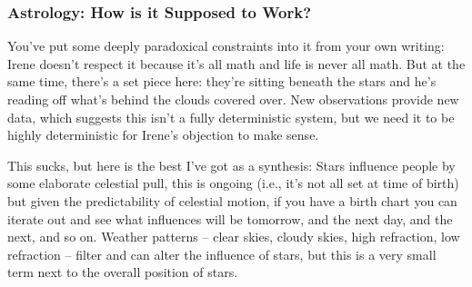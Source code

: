 \documentclass[../FGP.tex]{subfiles}
\begin{document}
\subsubsection{Astrology: How is it Supposed to Work?}
You've put some deeply paradoxical constraints into it from your own writing: Irene doesn't respect it because it's all math and life is never all math. But at the same time, there's a set piece here: they're sitting beneath the stars and he's reading off what's behind the clouds covered over. New observations provide new data, which suggests this isn't a fully deterministic system, but we need it to be highly deterministic for Irene's objection to make sense. 

This sucks, but here is the best I've got as a synthesis: Stars influence people by some elaborate celestial pull, this is ongoing (i.e., it's not all set at time of birth) but given the predictability of celestial motion, if you have a birth chart you can iterate out and see what influences will be tomorrow, and the next day, and the next, and so on. Weather patterns -- clear skies, cloudy skies, high refraction, low refraction -- filter and can alter the influence of stars, but this is a very small term next to the overall position of stars.  
\end{document}
